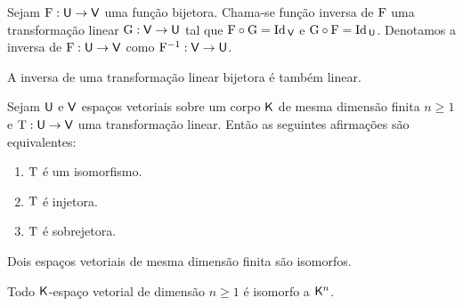 \documentclass[10pt,a4paper]{book}
\begin{document}
\begin{definition}
	Sejam $\mathrm{ F } : \mathsf{ U } \rightarrow \mathsf{ V }$ uma função bijetora. Chama-se função inversa de $\mathrm{ F }$ uma transformação linear $\mathrm{ G } : \mathsf{ V } \rightarrow \mathsf{ U }$ tal que $\mathrm{ F } \circ \mathrm{ G } = \mathrm{ Id }\,_{\mathsf{ V }}$ e $\mathrm{ G } \circ \mathrm{ F } = \mathrm{ Id }\,_{\mathsf{ U }}$. Denotamos a inversa de $\mathrm{ F } : \mathsf{ U } \rightarrow \mathsf{ V }$ como $\mathrm{ F }^{-1} : \mathsf{ V } \rightarrow \mathsf{ U }$.
\end{definition}

\begin{proposition}
	A inversa de uma transformação linear bijetora é também linear.
\end{proposition}

\begin{proposition}
	Sejam $\mathsf{ U }$ e $\mathsf{ V }$ espaços vetoriais sobre um corpo $\mathsf{ K }$ de mesma dimensão finita $n \geq 1$ e $\mathrm{ T } : \mathsf{ U } \rightarrow \mathsf{ V }$ uma transformação linear. Então as seguintes afirmações são equivalentes:
	\begin{enumerate}
		\item $\mathrm{ T }$ é um isomorfismo.
		\item $\mathrm{ T }$ é injetora.
		\item $\mathrm{ T }$ é sobrejetora.
	\end{enumerate}
\end{proposition}

\begin{theorem}
	Dois espaços vetoriais de mesma dimensão finita são isomorfos.
\end{theorem}

\begin{corollary}
	Todo $\mathsf{ K }$-espaço vetorial de dimensão $n \geq 1$ é isomorfo a $\mathsf{ K }^n$.
\end{corollary}




\end{document}

